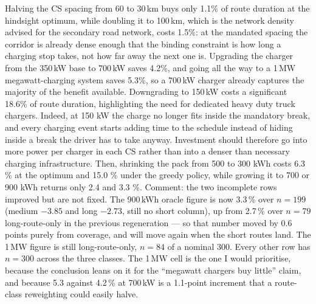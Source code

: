 \documentclass[preprint,12pt,3p]{elsarticle}
\newcommand{\green}[1]{{\color{darkgreen}#1}}
\newcommand{\blue}[1]{{\color{darkblue}#1}}
\begin{document}
Halving the CS spacing from 60 to 30\,km buys only 1.1\% of route duration at the hindsight optimum, while doubling it to 100\,km, which is the network density advised for the secondary road network, costs 1.5\%: at the mandated spacing the corridor is already dense enough that the binding constraint is how long a charging stop takes, not how far away the next one is.
Upgrading the charger from the 350\,kW base to 700\,kW saves \blue{4.2\%}, and going all the way to a 1\,MW megawatt-charging system saves \blue{5.3\%}, so a 700\,kW charger already captures the majority of the benefit available. Downgrading to 150\,kW costs a significant 18.6\% of route duration, highlighting the need for dedicated heavy duty truck chargers. Indeed, at 150 kW the charge no longer fits inside the mandatory break, and every charging event starts adding time to the schedule instead of hiding inside a break the driver has to take anyway.
Investment should therefore go into more power per charger in each CS rather than into a denser than necessary charging infrastructure.
Then, shrinking the pack from 500 to 300 kWh costs 6.3 \% at the optimum and \blue{15.0} \% under the greedy policy, while growing it to 700 or 900 kWh returns only \blue{2.4} and \blue{3.3} \%.
\green{Comment: the two incomplete rows improved but are not fixed. The 900\,kWh oracle
figure is now 3.3\,\% over $n=199$ (medium $-3.85$ and long $-2.73$, still no short
column), up from 2.7\,\% over $n=79$ long-route-only in the previous regeneration ---
so that number moved by 0.6 points purely from coverage, and will move again when
the short routes land. The 1\,MW figure is still long-route-only, $n=84$ of a nominal
300. Every other row has $n=300$ across the three classes. The 1\,MW cell is the one
I would prioritise, because the conclusion leans on it for the ``megawatt chargers
buy little'' claim, and because 5.3 against 4.2\,\% at 700\,kW is a 1.1-point
increment that a route-class reweighting could easily halve.}
\end{document}

